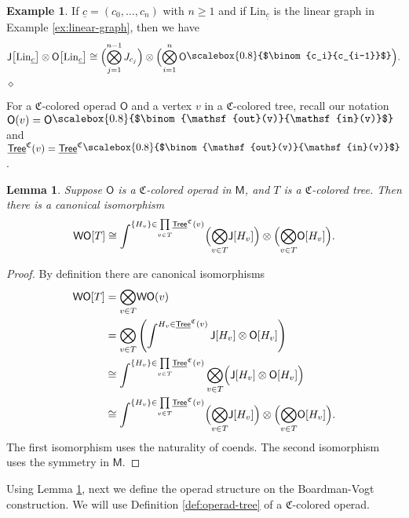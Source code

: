 \documentclass{amsbook}
\numberwithin{section}{chapter}
\numberwithin{subsection}{section}
\numberwithin{equation}{section}
\theoremstyle{plain}
\newtheorem{lemma}[equation]{Lemma}
\theoremstyle{definition}
\newtheorem{example}[equation]{Example}
\newcommand{\colorc}{\mathfrak{C}}
\newcommand{\Lin}{\mathrm{Lin}}
\newcommand{\J}{\mathsf{J}}
\newcommand{\M}{\mathsf{M}}
\renewcommand{\O}{\mathsf{O}}
\newcommand{\W}{\mathsf{W}}
\newcommand{\prodover}[1]{\underset{#1}{\prod}}
\newcommand{\bigtensorover}[1]{\underset{#1}{\bigotimes}}
\newcommand{\dqed}{\hfill$\diamond$}
\newcommand{\Tree}{\mathsf{Tree}}
\newcommand{\uTree}{\underline{\Tree}}
\newcommand{\uTreec}{\uTree^{\colorc}}
\newcommand{\wo}{\W\O}
\newcommand{\uc}{\underline c}
\newcommand{\sbinom}[2]{\raisebox{.05cm}{\scalebox{0.8}{$\binom{#1}{#2}$}}}
\newcommand{\inout}[1]{\raisebox{.05cm}{\scalebox{0.8}{$\binom{\out(#1)}{\inp(#1)}$}}}
\newcommand{\inoutv}{\inout{v}}
\newcommand{\inp}{\mathsf{in}}
\newcommand{\out}{\mathsf{out}}
\begin{document}
\begin{example}\label{ex:jo-linear}
If $\uc = (c_0,\ldots,c_n)$ with $n\geq 1$ and if $\Lin_{\uc}$ is the linear graph in Example \ref{ex:linear-graph}, then we have
\[\J\bigl[\Lin_{\uc}\bigr] \otimes \O\bigl[\Lin_{\uc}\bigr] \cong \Bigl(\bigotimes\limits_{j=1}^{n-1} J_{c_j}\Bigr) \otimes \Bigl(\bigotimes\limits_{i=1}^n\O\sbinom{c_i}{c_{i-1}}\Bigr).\]\dqed
\end{example}

For a $\colorc$-colored operad $\O$ and a vertex $v$ in a $\colorc$-colored tree, recall our notation $\O(v) = \O\inoutv$ and $\uTreec(v) = \uTreec\inoutv$.

\begin{lemma}\label{lem:wo-of-t}
Suppose $\O$ is a $\colorc$-colored operad in $\M$, and $T$ is a $\colorc$-colored tree.  Then there is a canonical isomorphism
\[\wo[T] \cong \int^{\{H_v\}\in \prodover{v\in T} \uTreec(v)} \Bigl(\bigtensorover{v\in T} \J[H_v]\Bigr) \otimes \Bigl(\bigtensorover{v\in T} \O[H_v]\Bigr).\]
\end{lemma}

\begin{proof}
By definition there are canonical isomorphisms
\[\begin{split} \wo[T] &= \bigtensorover{v\in T} \wo(v)\\
&= \bigtensorover{v\in T} \left(\int^{H_v\in\uTreec(v)} \J[H_v] \otimes \O[H_v]\right)\\
&\cong\int^{\{H_v\}\in \prodover{v\in T} \uTreec(v)} \bigtensorover{v\in T} \Bigl(\J[H_v]\otimes \O[H_v]\Bigr)\\
&\cong \int^{\{H_v\}\in \prodover{v\in T} \uTreec(v)} \Bigl(\bigtensorover{v\in T} \J[H_v]\Bigr) \otimes \Bigl(\bigtensorover{v\in T} \O[H_v]\Bigr).\end{split}\]
The first isomorphism uses the naturality of coends.  The second isomorphism uses the symmetry in $\M$.
\end{proof}

Using Lemma \ref{lem:wo-of-t}, next we define the operad structure on the Boardman-Vogt construction.  We will use Definition \ref{def:operad-tree} of a $\colorc$-colored operad.
\end{document}
